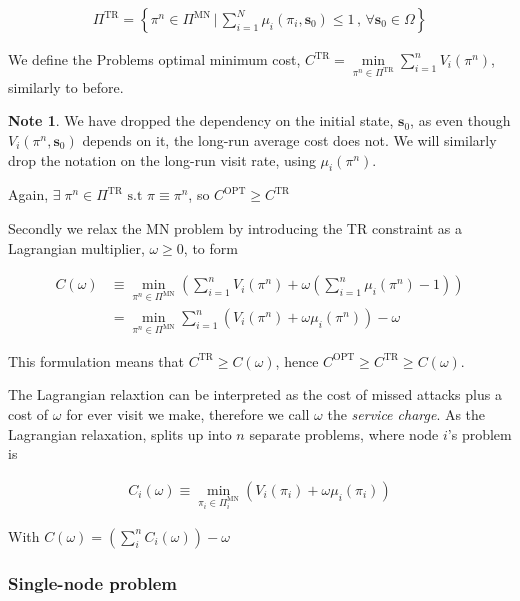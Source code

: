 \documentclass[a4paper,10pt]{article}
\theoremstyle{definition}
\theoremstyle{definition}
\theoremstyle{remark}
\theoremstyle{definition}
\newtheorem*{note}{Note}
\begin{document}
\begin{align*}
\Pi^{\text{TR}}=\left\{ \pi^{n} \in \Pi^{\text{MN}} \, \bigg| \, \sum\limits_{i=1}^{N} \mu_{i}(\pi_{i},\bm{s}_{0}) \leq 1 \, , \, \forall \bm{s}_{0} \in \Omega \right\}
\end{align*}

We define the Problems optimal minimum cost, $C^{\text{TR}}=\min\limits_{\pi^{n} \in \Pi^{\text{TR}}} \sum\limits_{i=1}^{n} V_{i}(\pi^{n})$, similarly to before.

\begin{note}
We have dropped the dependency on the initial state, $\bm{s}_{0}$, as even though $V_{i}(\pi^{n},\bm{s}_{0})$ depends on it, the long-run average cost does not. We will similarly drop the notation on the long-run visit rate, using $\mu_{i}(\pi^{n})$.
\end{note}

Again,  $\exists \; \pi^{n} \in \Pi^{\text{TR}} \text{ s.t } \pi \equiv \pi^{n}$, so $C^{\text{OPT}} \geq C^{\text{TR}} $

Secondly we relax the MN problem by introducing the TR constraint as a Lagrangian multiplier, $\omega \geq 0$, to form

\begin{align*}
C(\omega) & \equiv \min\limits_{\pi^{n} \in \Pi^{\text{MN}}} \left(\sum\limits_{i=1}^{n} V_{i}(\pi^{n}) + \omega \left(\sum\limits_{i=1}^{n} \mu_{i}(\pi^{n}) -1\right) \right) \\
&= \min\limits_{\pi^{n} \in \Pi^{\text{MN}}} \sum\limits_{i=1}^{n} \left(V_{i}(\pi^{n}) + \omega \mu_{i}(\pi^{n})\right)  -\omega
\end{align*}

This formulation means that $C^{\text{TR}} \geq C(\omega)$, hence $C^{\text{OPT}} \geq C^{\text{TR}} \geq C(\omega)$.

The Lagrangian relaxtion can be interpreted as the cost of missed attacks plus a cost of $\omega$ for ever visit we make, therefore we call $\omega$ the \textit{service charge}. As the Lagrangian relaxation, splits up into $n$ separate problems, where node $i$'s problem is

\begin{align*}
C_{i}(\omega) \equiv \min\limits_{\pi_{i} \in \Pi^{\text{MN}}_{i}} \left(V_{i}(\pi_{i}) + \omega \mu_{i}(\pi_{i})\right)
\end{align*}

With $C(\omega)=\left(\sum\limits_{i}^{n} C_{i}(\omega)\right) -\omega$

\subsubsection{Single-node problem}
\end{document}

